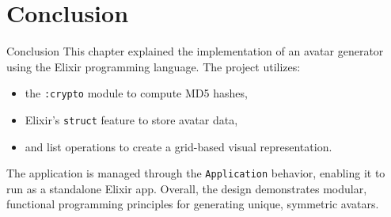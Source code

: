 \documentclass[aspectratio=169, table]{beamer}
\begin{document}
\section{Conclusion}
\begin{frame}[fragile]{Conclusion}
\small
This chapter explained the implementation of an avatar generator using the Elixir programming language.  
The project utilizes:
\begin{itemize}
  \item the \texttt{:crypto} module to compute MD5 hashes,
  \item Elixir’s \texttt{struct} feature to store avatar data,
  \item and list operations to create a grid-based visual representation.
\end{itemize}
The application is managed through the \texttt{Application} behavior, enabling it to run as a standalone Elixir app.  
Overall, the design demonstrates modular, functional programming principles for generating unique, symmetric avatars.
\end{frame}
\end{document}
